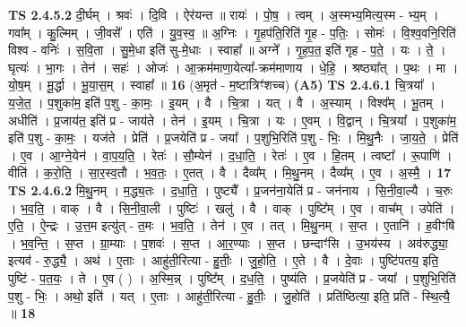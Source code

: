 \documentclass[17pt]{extarticle}
\begin{document}
                  \newline
                                \textbf{ TS 2.4.5.2} \newline
                  दी॒र्घम् । श्रवः॑ । दि॒वि । ऐर॑यन्त ॥ रायः॑ । पो॒ष॒ । त्वम् । अ॒स्मभ्य॒मित्य॒स्म - भ्य॒म् । गवा᳚म् । कु॒ल्मिम् । जी॒वसे᳚ । एति॑ । यु॒व॒स्व॒ ॥ अ॒ग्निः । गृ॒हप॑ति॒रिति॑ गृ॒ह - प॒तिः॒ । सोमः॑ । वि॒श्व॒वनि॒रिति॑ विश्व - वनिः॑ । स॒वि॒ता । सु॒मे॒धा इति॑ सु-मे॒धाः । स्वाहा᳚ ॥ अग्ने᳚ । गृ॒ह॒प॒त॒ इति॑ गृह - प॒ते॒ । यः । ते॒ । घृत्यः॑ । भा॒गः । तेन॑ । सहः॑ । ओजः॑ । आ॒क्रम॑माणा॒येत्या᳚-क्रम॑माणाय । धे॒हि॒ । श्रष्ठ्या᳚त् । प॒थः । मा । यो॒ष॒म् । मू॒र्द्धा । भू॒या॒स॒म् । स्वाहा᳚ ॥ \textbf{  16} \newline
                  \newline
                      (अ॒मृत॑ - म॒ष्टात्रिꣳ॑शच्च)  \textbf{(A5)} \newline \newline
                                \textbf{ TS 2.4.6.1} \newline
                  चि॒त्रया᳚ । य॒जे॒त॒ । प॒शुका॑म॒ इति॑ प॒शु - का॒मः॒ । इ॒यम् । वै । चि॒त्रा । यत् । वै । अ॒स्याम् । विश्व᳚म् । भू॒तम् । अधीति॑ । प्र॒जाय॑त॒ इति॑ प्र - जाय॑ते । तेन॑ । इ॒यम् । चि॒त्रा । यः । ए॒वम् । वि॒द्वान् । चि॒त्रया᳚ । प॒शुका॑म॒ इति॑ प॒शु - का॒मः॒ । यज॑ते । प्रेति॑ । प्र॒जयेति॑ प्र - जया᳚ । प॒शुभि॒रिति॑ प॒शु - भिः॒ । मि॒थु॒नैः । जा॒य॒ते॒ । प्रेति॑ । ए॒व । आ॒ग्ने॒येन॑ । वा॒प॒य॒ति॒ । रेतः॑ । सौ॒म्येन॑ । द॒धा॒ति॒ । रेतः॑ । ए॒व । हि॒तम् । त्वष्टा᳚ । रू॒पाणि॑ । वीति॑ । क॒रो॒ति॒ । सा॒र॒स्व॒तौ । भ॒व॒तः॒ । ए॒तत् । वै । दैव्य᳚म् । मि॒थु॒नम् । दैव्य᳚म् । ए॒व । अ॒स्मै॒ । \textbf{  17} \newline
                  \newline
                                \textbf{ TS 2.4.6.2} \newline
                  मि॒थु॒नम् । म॒द्ध्य॒तः । द॒धा॒ति॒ । पुष्ट्यै᳚ । प्र॒जन॑ना॒येति॑ प्र - जन॑नाय । सि॒नी॒वा॒ल्यै । च॒रुः । भ॒व॒ति॒ । वाक् । वै । सि॒नी॒वा॒ली । पुष्टिः॑ । खलु॑ । वै । वाक् । पुष्टि᳚म् । ए॒व । वाच᳚म् । उपेति॑ । ए॒ति॒ । ऐ॒न्द्रः । उ॒त्त॒म इत्यु॑त् - त॒मः । भ॒व॒ति॒ । तेन॑ । ए॒व । तत् । मि॒थु॒नम् । स॒प्त । ए॒तानि॑ । ह॒वीꣳषि॑ । भ॒व॒न्ति॒ । स॒प्त । ग्रा॒म्याः । प॒शवः॑ । स॒प्त । आ॒र॒ण्याः । स॒प्त । छन्दाꣳ॑सि । उ॒भय॑स्य । अव॑रुद्ध्या॒ इत्यव॑ - रु॒द्ध्यै॒ । अथ॑ । ए॒ताः । आहु॑ती॒रित्या - हु॒तीः॒ । जु॒हो॒ति॒ । ए॒ते । वै । दे॒वाः । पुष्टि॑पतय॒ इति॒ पुष्टि॑ - प॒त॒यः॒ । ते । ए॒व ( ) । अ॒स्मि॒न्न् । पुष्टि᳚म् । द॒ध॒ति॒ । पुष्य॑ति । प्र॒जयेति॑ प्र - जया᳚ । प॒शुभि॒रिति॑ प॒शु - भिः॒ । अथो॒ इति॑ । यत् । ए॒ताः । आहु॑ती॒रित्या - हु॒तीः॒ । जु॒होति॑ । प्रति॑ष्ठित्या॒ इति॒ प्रति॑ - स्थि॒त्यै॒ ॥ \textbf{  18} \newline
\end{document}

